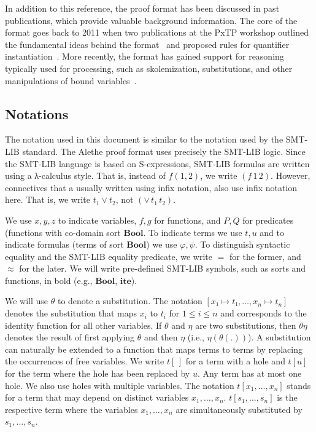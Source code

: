 \documentclass{scrartcl}
\newcommand\lsymb[1]{\mathbf{#1}}
\theoremstyle{definition}
\begin{document}
In addition to this reference, the proof format has been discussed in past
publications, which provide valuable background information.  The core of
the format goes back to 2011 when two publications at the PxTP workshop
outlined the fundamental ideas behind the format~\cite{besson-2011}
and proposed rules for quantifier instantiation~\cite{deharbe-2011}.
%
More recently, the format has gained support for reasoning typically used for
processing, such as skolemization, substitutions, and other manipulations of
bound variables~\cite{barbosa-2019}.

\subsection{Notations}

The notation used in this document is similar to the notation
used by the SMT-LIB standard.  The Alethe proof format uses precisely
the SMT-LIB logic.  Since the SMT-LIB language is based on
S-expressions, SMT-LIB formulas are written using
a λ-calculus style.  That is, instead of $f(1,2)$, we write $(f\,1\,2)$.
However, connectives that a usually written using infix notation, also
use infix notation here.  That is, we write $t_1 \lor t_2$, not
$(\lor\,t_1\,t_2)$.

We use $x, y, z$ to indicate variables,
$f, g$ for functions, and $P, Q$ for predicates (functions with co-domain
sort $\lsymb{Bool}$.  To indicate terms we use $t, u$ and to indicate
formulas (terms of sort $\lsymb{Bool}$) we use $\varphi, \psi$.
To distinguish syntactic equality and the SMT-LIB equality predicate,
we write $=$ for the former, and $≈$ for the later.
We will write pre-defined SMT-LIB symbols, such as sorts and functions,
in bold (e.g., $\lsymb{Bool}$, $\lsymb{ite}$).

We will use $θ$ to denote a
substitution.
The notation $[x₁ ↦ t₁, …, x_n ↦ t_n]$ denotes the substitution
that maps $x_i$ to $t_i$ for $1 ≤ i ≤ n$ and corresponds to the
identity function for all other variables.  If $θ$ and $η$ are two
substitutions, then $θη$ denotes the result of first applying $θ$
and then $η$ (i.e., $η(θ(.))$).  A substitution can naturally be extended
to a function that maps terms to terms by replacing the occurrences of
free variables.
%
We write $t[\,]$ for a term with a hole and $t[u]$ for the term where
the hole has been replaced by $u$. Any term has at most one hole.
%
We also use holes with multiple variables.
%
The notation $t[x_1, \dots, x_n]$ stands for a term that may depend on distinct
variables $x_1, \dots, x_n$.
%
$t[s_1,\dots, s_n]$ is the respective term where the variables $x_1,\dots, x_n$ are
simultaneously substituted by $s_1,\dots, s_n$.
\end{document}
